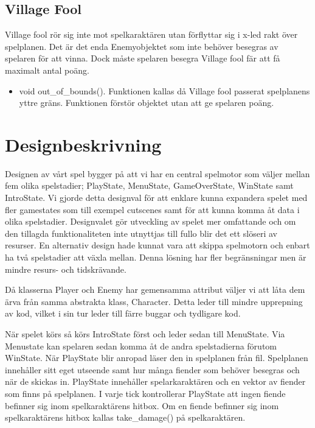 \documentclass{TDP005mall}
\begin{document}
\subsection{Village Fool}
Village fool rör sig inte mot spelkaraktären utan förflyttar sig i x-led rakt över spelplanen.
Det är det enda Enemyobjektet som inte behöver besegras av spelaren för att vinna. 
Dock måste spelaren besegra Village fool fär att få maximalt antal poäng.
\begin{itemize}
    \item void out\_of\_bounds(). Funktionen kallas då Village fool passerat spelplanens yttre gräns.
        Funktionen förstör objektet utan att ge spelaren poäng.
\end{itemize}
\newpage
\section{Designbeskrivning}
Designen av vårt spel bygger på att vi har en central spelmotor som väljer mellan fem olika spelstadier;
PlayState, MenuState, GameOverState, WinState samt IntroState.
Vi gjorde detta designval för att enklare kunna expandera spelet med fler gamestates som till exempel cutscenes samt för att kunna komma åt data i olika spelstadier. 
Designvalet gör utveckling av spelet mer omfattande och om den tillagda funktionaliteten inte utnyttjas till fullo blir det ett slöseri av resurser.
En alternativ design hade kunnat vara att skippa spelmotorn och enbart ha två spelstadier att växla mellan.
Denna lösning har fler begränsningar men är mindre resurs- och tidskrävande.

Då klasserna Player och Enemy har gemensamma attribut väljer vi att låta dem ärva från samma abstrakta klass, Character. 
Detta leder till mindre upprepning av kod, vilket i sin tur leder till färre buggar och tydligare kod.

När spelet körs så körs IntroState först och leder sedan till MenuState. 
Via Menustate kan spelaren sedan komma åt de andra spelstadierna förutom WinState.
När PlayState blir anropad läser den in spelplanen från fil. 
Spelplanen innehåller sitt eget utseende samt hur många fiender som behöver besegras och när de skickas in.
PlayState innehåller spelarkaraktären och en vektor av fiender som finns på spelplanen.
I varje tick kontrollerar PlayState att ingen fiende befinner sig inom spelkaraktärens hitbox. 
Om en fiende befinner sig inom spelkaraktärens hitbox kallas take\_damage() på spelkaraktären.
\end{document}
